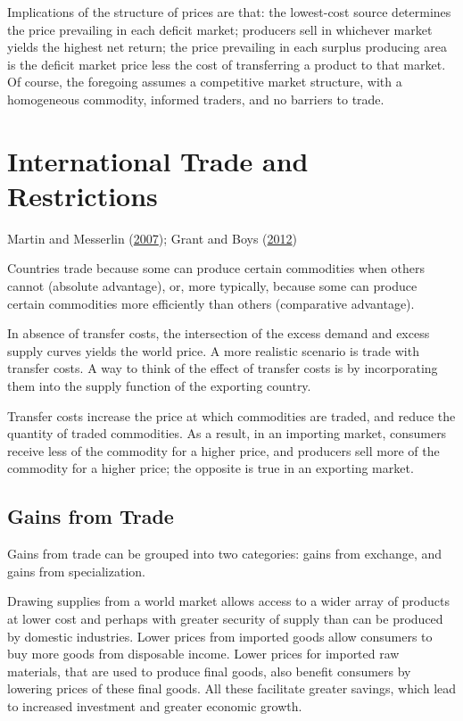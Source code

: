 \documentclass[
]{book}
\begin{document}
Implications of the structure of prices are that: the lowest-cost source determines the price prevailing in each deficit market; producers sell in whichever market yields the highest net return; the price prevailing in each surplus producing area is the deficit market price less the cost of transferring a product to that market. Of course, the foregoing assumes a competitive market structure, with a homogeneous commodity, informed traders, and no barriers to trade.

\hypertarget{international-trade-and-restrictions}{%
\chapter{International Trade and Restrictions}\label{international-trade-and-restrictions}}

Martin and Messerlin (\protect\hyperlink{ref-martin2007}{2007}); Grant and Boys (\protect\hyperlink{ref-grant2012}{2012})

Countries trade because some can produce certain commodities when others cannot (absolute advantage), or, more typically, because some can produce certain commodities more efficiently than others (comparative advantage).

In absence of transfer costs, the intersection of the excess demand and excess supply curves yields the world price. A more realistic scenario is trade with transfer costs. A way to think of the effect of transfer costs is by incorporating them into the supply function of the exporting country.

Transfer costs increase the price at which commodities are traded, and reduce the quantity of traded commodities. As a result, in an importing market, consumers receive less of the commodity for a higher price, and producers sell more of the commodity for a higher price; the opposite is true in an exporting market.

\hypertarget{gains-from-trade}{%
\section{Gains from Trade}\label{gains-from-trade}}

Gains from trade can be grouped into two categories: gains from exchange, and gains from specialization.

Drawing supplies from a world market allows access to a wider array of products at lower cost and perhaps with greater security of supply than can be produced by domestic industries. Lower prices from imported goods allow consumers to buy more goods from disposable income. Lower prices for imported raw materials, that are used to produce final goods, also benefit consumers by lowering prices of these final goods. All these facilitate greater savings, which lead to increased investment and greater economic growth.
\end{document}
